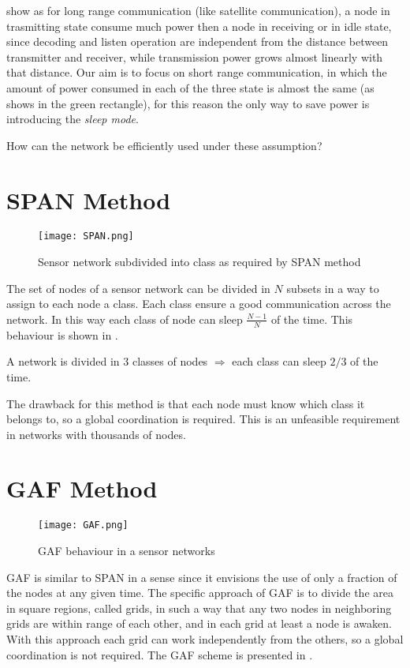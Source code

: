  show as for long range communication (like satellite communication), a node in trasmitting state consume much power then a node in receiving or in idle state, since decoding and listen operation are independent from the distance between transmitter and receiver, while transmission power grows almost linearly with that distance.
Our aim is to focus on short range communication, in which the amount of power consumed in each of the three state is almost the same (as  shows in the green rectangle), for this reason the only way to save power is introducing the \textit{sleep mode}.

How can the network be efficiently used under these assumption?

\section{SPAN Method}
\begin{figure}[h]
	\centering
	\texttt{[image: SPAN.png]}
	\caption{Sensor network subdivided into class as required by SPAN method}
	\label{fig:SPAN}
\end{figure}

The set of nodes of a sensor network can be divided in $N$ subsets in a way to assign to each node a class.
Each class ensure a good communication across the network.
In this way each class of node can sleep $\frac{N-1}{N}$ of the time.
This behaviour is shown in .

\begin{example}
	A network is divided in 3 classes of nodes $\Rightarrow$ each class can sleep $2/3$ of the time.
\end{example}

The drawback for this method is that each node must know which class it belongs to, so a global coordination is required. This is an unfeasible requirement in networks with thousands of nodes.

\section{GAF Method}
\begin{figure}[h]
	\centering
	\texttt{[image: GAF.png]}
	\caption{GAF behaviour in a sensor networks}
	\label{fig:GAF}
\end{figure}
GAF is similar to SPAN in a sense since it envisions the use of only a fraction of the nodes at any given time. The
specific approach of GAF is to divide the area in square
regions, called grids, in such a way that any two nodes in
neighboring grids are within range of each other, and in each grid at least a node is awaken. With this approach each grid can work independently from the others, so a global coordination is not required. The GAF scheme is presented in .

